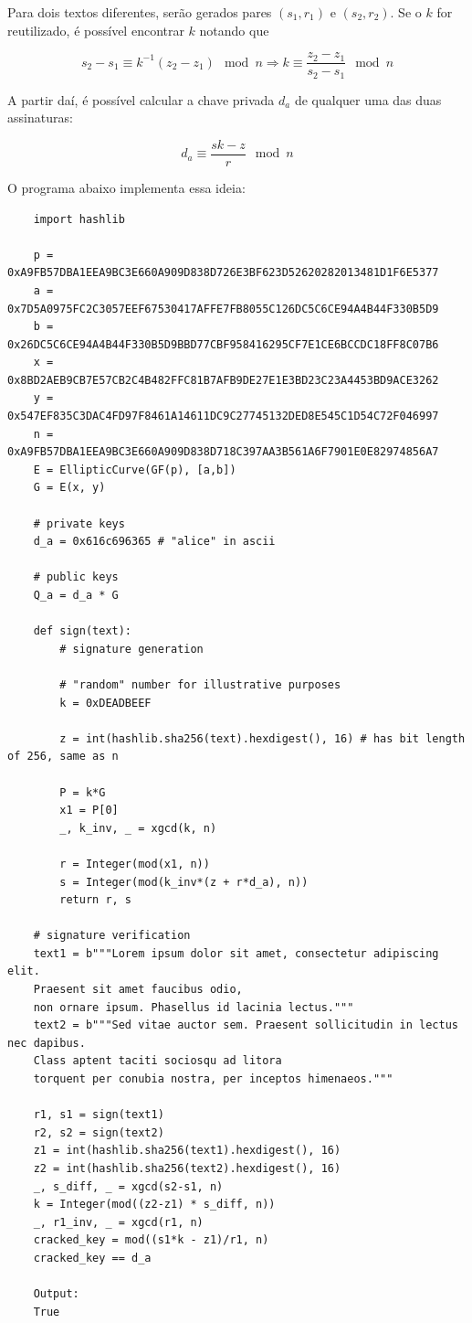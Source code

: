 \documentclass{article}
\begin{document}
Para dois textos diferentes, serão gerados pares $(s_1, r_1)$ e $(s_2, r_2)$. Se o $k$ for reutilizado, é possível encontrar $k$ notando que

\begin{equation*}
    s_2 - s_1 \equiv k^{-1}(z_2 - z_1) \mod n \Rightarrow k \equiv \frac{z_2 - z_1}{s_2 - s_1} \mod n
\end{equation*}

A partir daí, é possível calcular a chave privada $d_a$ de qualquer uma das duas assinaturas:

\begin{equation*}
    d_a \equiv \frac{sk - z}{r} \mod n
\end{equation*}

O programa abaixo implementa essa ideia:

\begin{verbatim}
    import hashlib

    p = 0xA9FB57DBA1EEA9BC3E660A909D838D726E3BF623D52620282013481D1F6E5377
    a = 0x7D5A0975FC2C3057EEF67530417AFFE7FB8055C126DC5C6CE94A4B44F330B5D9
    b = 0x26DC5C6CE94A4B44F330B5D9BBD77CBF958416295CF7E1CE6BCCDC18FF8C07B6
    x = 0x8BD2AEB9CB7E57CB2C4B482FFC81B7AFB9DE27E1E3BD23C23A4453BD9ACE3262
    y = 0x547EF835C3DAC4FD97F8461A14611DC9C27745132DED8E545C1D54C72F046997
    n = 0xA9FB57DBA1EEA9BC3E660A909D838D718C397AA3B561A6F7901E0E82974856A7
    E = EllipticCurve(GF(p), [a,b])
    G = E(x, y)
    
    # private keys
    d_a = 0x616c696365 # "alice" in ascii
    
    # public keys
    Q_a = d_a * G
    
    def sign(text):
        # signature generation
    
        # "random" number for illustrative purposes
        k = 0xDEADBEEF
    
        z = int(hashlib.sha256(text).hexdigest(), 16) # has bit length of 256, same as n
    
        P = k*G
        x1 = P[0]
        _, k_inv, _ = xgcd(k, n)
    
        r = Integer(mod(x1, n))
        s = Integer(mod(k_inv*(z + r*d_a), n))
        return r, s
    
    # signature verification
    text1 = b"""Lorem ipsum dolor sit amet, consectetur adipiscing elit.
    Praesent sit amet faucibus odio,
    non ornare ipsum. Phasellus id lacinia lectus."""
    text2 = b"""Sed vitae auctor sem. Praesent sollicitudin in lectus nec dapibus.
    Class aptent taciti sociosqu ad litora
    torquent per conubia nostra, per inceptos himenaeos."""
    
    r1, s1 = sign(text1)
    r2, s2 = sign(text2)
    z1 = int(hashlib.sha256(text1).hexdigest(), 16)
    z2 = int(hashlib.sha256(text2).hexdigest(), 16)
    _, s_diff, _ = xgcd(s2-s1, n)
    k = Integer(mod((z2-z1) * s_diff, n))
    _, r1_inv, _ = xgcd(r1, n)
    cracked_key = mod((s1*k - z1)/r1, n)
    cracked_key == d_a 

    Output:
    True
\end{verbatim}
\end{document}
